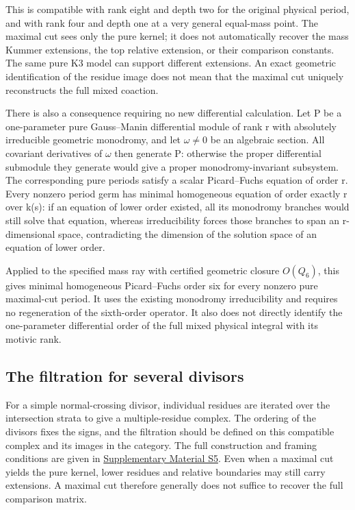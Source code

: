 \documentclass[11pt,a4paper,oneside]{article}
\theoremstyle{plain}
\theoremstyle{definition}
\theoremstyle{remark}
\numberwithin{equation}{section}
\newcommand{\otherref}[2]{\href{#1.pdf}{#2}}
\begin{document}
This is compatible with rank eight and depth two for the original physical period, and with rank four and depth one at a very general equal-mass point. The maximal cut sees only the pure kernel; it does not automatically recover the mass Kummer extensions, the top relative extension, or their comparison constants. The same pure K3 model can support different extensions. An exact geometric identification of the residue image does not mean that the maximal cut uniquely reconstructs the full mixed coaction.

There is also a consequence requiring no new differential calculation. Let P be a one-parameter pure Gauss--Manin differential module of rank r with absolutely irreducible geometric monodromy, and let \(\omega \ne 0\) be an algebraic section. All covariant derivatives of \(\omega \) then generate P: otherwise the proper differential submodule they generate would give a proper monodromy-invariant subsystem. The corresponding pure periods satisfy a scalar Picard--Fuchs equation of order r. Every nonzero period germ has minimal homogeneous equation of order exactly r over k(s): if an equation of lower order existed, all its monodromy branches would still solve that equation, whereas irreducibility forces those branches to span an r-dimensional space, contradicting the dimension of the solution space of an equation of lower order.

Applied to the specified mass ray with certified geometric closure \(O(Q_6)\), this gives minimal homogeneous Picard--Fuchs order six for every nonzero pure maximal-cut period. It uses the existing monodromy irreducibility and requires no regeneration of the sixth-order operator. It also does not directly identify the one-parameter differential order of the full mixed physical integral with its motivic rank.



\endgroup
\subsection{The filtration for several divisors}
For a simple normal-crossing divisor, individual residues are iterated over the intersection strata to give a multiple-residue complex. The ordering of the divisors fixes the signs, and the filtration should be defined on this compatible complex and its images in the category. The full construction and framing conditions are given in \otherref{feynman_periods_supplement_en}{Supplementary Material S5}. Even when a maximal cut yields the pure kernel, lower residues and relative boundaries may still carry extensions. A maximal cut therefore generally does not suffice to recover the full comparison matrix.
\end{document}
